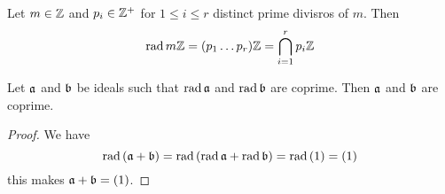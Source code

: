 \begin{example}\label{example_1.8}
    Let $m \in \Z$ and  $p_i \in \Z^+$ for $1 \leq i \leq r$ distinct prime
    divisros of $m$. Then
    \begin{equation*}
        \rad{m\Z}=(p_1 \dots p_r)\Z=\bigcap_{i=1}^r{p_i\Z}
    \end{equation*}
\end{example}

\begin{lemma}\label{1.9.14}
    Let $\af$ and  $\bf$ be ideals such that  $\rad{\af}$ and $\rad{\bf}$ are
    coprime. Then $\af$ and  $\bf$ are coprime.
\end{lemma}
\begin{proof}
    We have
    \begin{equation*}
        \rad{(\af+\bf)}=\rad{(\rad{\af}+\rad{\bf})}=\rad{(1)}=(1)
    \end{equation*}
    this makes $\af+\bf=(1)$.
\end{proof}
